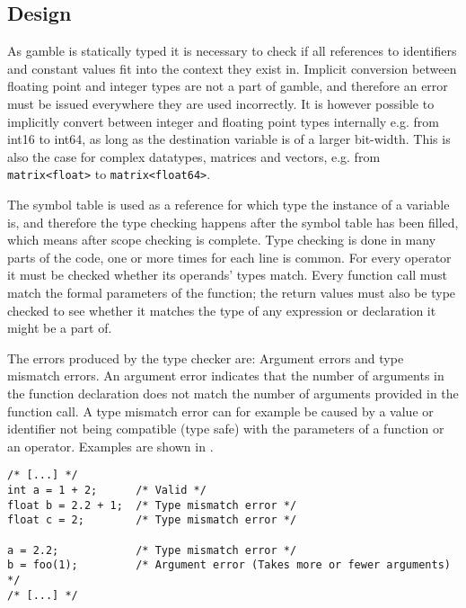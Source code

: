 \subsection*{Design}
As \gls{gamble} is statically typed it is necessary to check if all references to identifiers and constant values fit into the context they exist in. 
Implicit conversion between floating point and integer types are not a part of \gls{gamble}, and therefore an error must be issued everywhere they are used incorrectly. 
It is however possible to implicitly convert between integer and floating point types internally e.g. from int16 to int64, as long as the destination variable is of a larger bit-width. 
This is also the case for complex datatypes, matrices and vectors, e.g. from \texttt{matrix<float>} to \texttt{matrix<float64>}.

The symbol table is used as a reference for which type the instance of a variable is, and therefore the type checking happens after the symbol table has been filled, which means after scope checking is complete. 
Type checking is done in many parts of the code, one or more times for each line is common. 
For every operator it must be checked whether its operands' types match. 
Every function call must match the formal parameters of the function; the return values must also be type checked to see whether it matches the type of any expression or declaration it might be a part of.

The errors produced by the type checker are: Argument errors and type mismatch errors.
An argument error indicates that the number of arguments in the function declaration does not match the number of arguments provided in the function call.
A type mismatch error can for example be caused by a value or identifier not being compatible (type safe) with the parameters of a function or an operator.
Examples are shown in .

\begin{lstlisting}[caption=Examples of type errors in \gls{gamble},numbers=none,frame=tlrb,label={lst:typeErrors}]
/* [...] */
int a = 1 + 2;      /* Valid */
float b = 2.2 + 1;  /* Type mismatch error */
float c = 2;        /* Type mismatch error */

a = 2.2;            /* Type mismatch error */
b = foo(1);         /* Argument error (Takes more or fewer arguments) */ 
/* [...] */
\end{lstlisting}


